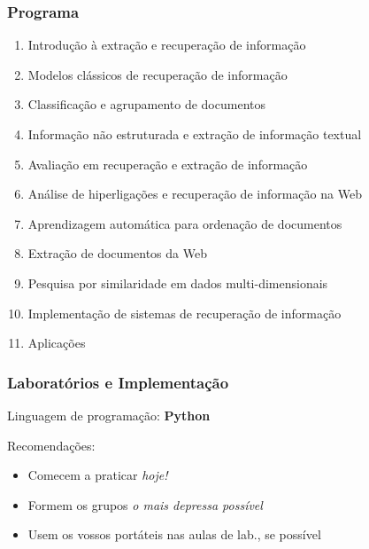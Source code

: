 \documentclass{beamer}
\begin{document}
\begin{frame} 
    \frametitle{Programa}
    \begin{enumerate}
    \footnotesize
	\item Introdução à extração e recuperação de informação 
	\item Modelos clássicos de recuperação de informação
    \item Classificação e agrupamento de documentos
	\item Informação não estruturada e extração de informação textual
	\item Avaliação em recuperação e extração de informação 
	\item Análise de hiperligações e recuperação de informação na Web
    \item Aprendizagem automática para ordenação de documentos
    \item Extração de documentos da Web
	\item Pesquisa por similaridade em dados multi-dimensionais 
	\item Implementação de sistemas de recuperação de informação
	\item Aplicações
	\end{enumerate}
\end{frame}

\begin{frame}
    \frametitle{Laboratórios e Implementação}
    \begin{center}
        Linguagem de programação: \textbf{Python} \\[.5\baselineskip]
    \end{center}
    \begin{block}{Recomendações:}
        \begin{itemize}
        \item Comecem a praticar \emph{hoje!}
        \item Formem os grupos \emph{o mais depressa possível}
        \item Usem os vossos portáteis nas aulas de lab., se possível
        \end{itemize}
    \end{block}
\end{frame}
\end{document}

